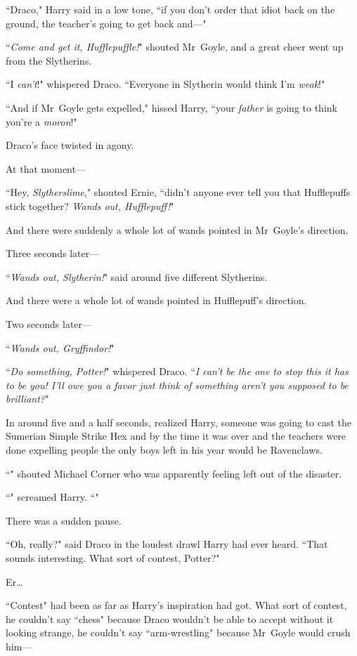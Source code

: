 ``Draco," Harry said in a low tone, ``if you don't order that idiot back on the ground, the teacher's going to get back and—"

``\emph{Come and get it, Hufflepuffle!}" shouted Mr~Goyle, and a great cheer went up from the Slytherins.

``I \emph{can't}!" whispered Draco. ``Everyone in Slytherin would think I'm \emph{weak}!"

``And if Mr~Goyle gets expelled," hissed Harry, ``your \emph{father} is going to think you're a \emph{moron}!"

Draco's face twisted in agony.

At that moment—

``Hey, \emph{Slytherslime}," shouted Ernie, ``didn't anyone ever tell you that Hufflepuffs stick together? \emph{Wands out, Hufflepuff!}"

And there were suddenly a whole lot of wands pointed in Mr~Goyle's direction.

Three seconds later—

``\emph{Wands out, Slytherin!}" said around five different Slytherins.

And there were a whole lot of wands pointed in Hufflepuff's direction.

Two seconds later—

``\emph{Wands out, Gryffindor!}"

``\emph{Do something, Potter!}" whispered Draco. ``\emph{I can't be the one to stop this it has to be you! I'll owe you a favor just think of something aren't you supposed to be brilliant?}"

In around five and a half seconds, realized Harry, someone was going to cast the Sumerian Simple Strike Hex and by the time it was over and the teachers were done expelling people the only boys left in his year would be Ravenclaws.

``" shouted Michael Corner who was apparently feeling left out of the disaster.

``" screamed Harry. ``"

There was a sudden pause.

``Oh, really?" said Draco in the loudest drawl Harry had ever heard. ``That sounds interesting. What sort of contest, Potter?"

Er{\ldots}

``Contest" had been as far as Harry's inspiration had got. What sort of contest, he couldn't say ``chess" because Draco wouldn't be able to accept without it looking strange, he couldn't say ``arm-wrestling" because Mr~Goyle would crush him—

